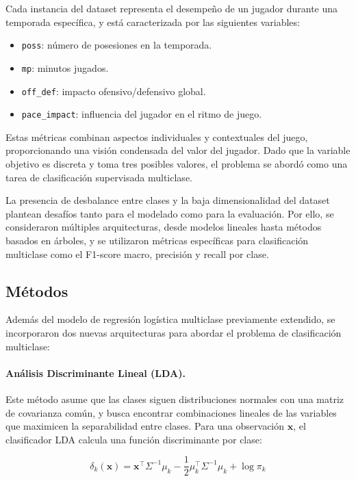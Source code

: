 \documentclass[11pt]{article}
\begin{document}
Cada instancia del dataset representa el desempeño de un jugador durante una temporada específica, y está caracterizada por las siguientes variables:

\begin{itemize}
    \item \texttt{poss}: número de posesiones en la temporada.
    \item \texttt{mp}: minutos jugados.
    \item \texttt{off\_def}: impacto ofensivo/defensivo global.
    \item \texttt{pace\_impact}: influencia del jugador en el ritmo de juego.
\end{itemize}

Estas métricas combinan aspectos individuales y contextuales del juego, proporcionando una visión condensada del valor del jugador. Dado que la variable objetivo es discreta y toma tres posibles valores, el problema se abordó como una tarea de clasificación supervisada multiclase.

La presencia de desbalance entre clases y la baja dimensionalidad del dataset plantean desafíos tanto para el modelado como para la evaluación. Por ello, se consideraron múltiples arquitecturas, desde modelos lineales hasta métodos basados en árboles, y se utilizaron métricas específicas para clasificación multiclase como el F1-score macro, precisión y recall por clase.



\subsection{Métodos}

Además del modelo de regresión logística multiclase previamente extendido, se incorporaron dos nuevas arquitecturas para abordar el problema de clasificación multiclase:

\paragraph{Análisis Discriminante Lineal (LDA).}
Este método asume que las clases siguen distribuciones normales con una matriz de covarianza común, y busca encontrar combinaciones lineales de las variables que maximicen la separabilidad entre clases. Para una observación $\mathbf{x}$, el clasificador LDA calcula una función discriminante por clase:

\[
\delta_k(\mathbf{x}) = \mathbf{x}^\top \Sigma^{-1} \mu_k - \frac{1}{2} \mu_k^\top \Sigma^{-1} \mu_k + \log \pi_k
\]
\end{document}

